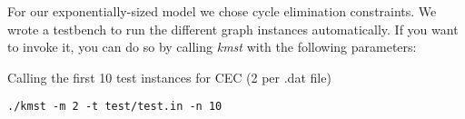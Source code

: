 \documentclass{article}
\begin{document}
\sloppy


\clearpage

For our exponentially-sized model we chose cycle elimination constraints. We wrote a testbench to run the different graph instances automatically. If you want to invoke it, you can do so by calling \textit{kmst} with the following parameters:

\hspace{0.5cm}

Calling the first 10 test instances for CEC (2 per .dat file)
\begin{lstlisting}
./kmst -m 2 -t test/test.in -n 10 
\end{lstlisting}




\clearpage
\end{document}
